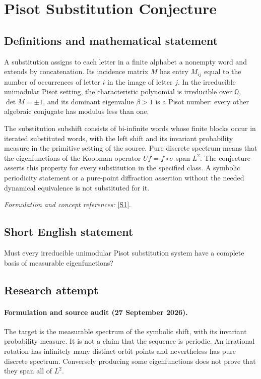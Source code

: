 \documentclass[11pt]{article}
\begin{document}
\section*{\texorpdfstring{Pisot Substitution Conjecture}{Pisot Substitution Conjecture}}\label{statement}
\subsection{Definitions and mathematical statement}
A substitution assigns to each letter in a finite alphabet a nonempty word and extends by concatenation. Its incidence matrix $M$ has entry $M_{ij}$ equal to the number of occurrences of letter $i$ in the image of letter $j$. In the irreducible unimodular Pisot setting, the characteristic polynomial is irreducible over ${\mathbb{Q}}$, $\det M=\pm1$, and its dominant eigenvalue $\beta>1$ is a Pisot number: every other algebraic conjugate has modulus less than one.

The substitution subshift consists of bi-infinite words whose finite blocks occur in iterated substituted words, with the left shift and its invariant probability measure in the primitive setting of the source. Pure discrete spectrum means that the eigenfunctions of the Koopman operator $Uf=f\circ\sigma$ span $L^2$. The conjecture asserts this property for every substitution in the specified class. A symbolic periodicity statement or a pure-point diffraction assertion without the needed dynamical equivalence is not substituted for it.
\par\smallskip\textit{Formulation and concept references:} \href{https://ems.press/content/serial-article-files/32990?nt=1}{[S1]}.

\subsection{Short English statement}
Must every irreducible unimodular Pisot substitution system have a complete basis of measurable eigenfunctions?
\subsection{Research attempt}
\paragraph{Formulation and source audit (27 September 2026).}
The target is the measurable spectrum of the symbolic shift, with its
invariant probability measure. It is not a claim that the sequence is
periodic. An irrational rotation has infinitely many distinct orbit points
and nevertheless has pure discrete spectrum. Conversely producing some
eigenfunctions does not prove that they span all of $L^2$.
\end{document}
